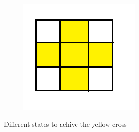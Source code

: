 \documentclass[a4paper,11pt]{kth-mag}
\begin{document}
\begin{figure}[h]
\begin{subfigure}[!b]{0.3\textwidth}
	\end{subfigure}
	\begin{subfigure}[!b]{0.3\textwidth}
		\includegraphics[width=\textwidth]{figs/step43.png}
	\end{subfigure}
	\caption{Different states to achive the yellow cross}
	\label{fig_8}
\end{figure}
\newpage
\end{document}
